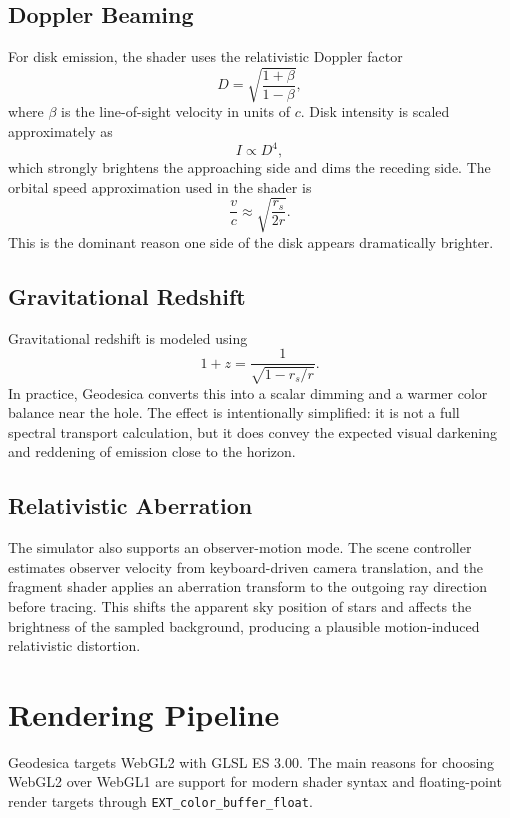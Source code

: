 \documentclass[12pt]{article}
\begin{document}
\subsection{Doppler Beaming}
For disk emission, the shader uses the relativistic Doppler factor
\begin{equation}
D = \sqrt{\frac{1+\beta}{1-\beta}},
\label{eq:doppler_factor}
\end{equation}
where $\beta$ is the line-of-sight velocity in units of $c$. Disk intensity is scaled approximately as
\begin{equation}
I \propto D^4,
\label{eq:doppler_intensity}
\end{equation}
which strongly brightens the approaching side and dims the receding side. The orbital speed approximation used in the shader is
\begin{equation}
\frac{v}{c} \approx \sqrt{\frac{r_s}{2r}}.
\label{eq:keplerian_beta}
\end{equation}
This is the dominant reason one side of the disk appears dramatically brighter.

\subsection{Gravitational Redshift}
Gravitational redshift is modeled using
\begin{equation}
1 + z = \frac{1}{\sqrt{1 - r_s/r}}.
\label{eq:grav_redshift}
\end{equation}
In practice, Geodesica converts this into a scalar dimming and a warmer color balance near the hole. The effect is intentionally simplified: it is not a full spectral transport calculation, but it does convey the expected visual darkening and reddening of emission close to the horizon.

\subsection{Relativistic Aberration}
The simulator also supports an observer-motion mode. The scene controller estimates observer velocity from keyboard-driven camera translation, and the fragment shader applies an aberration transform to the outgoing ray direction before tracing. This shifts the apparent sky position of stars and affects the brightness of the sampled background, producing a plausible motion-induced relativistic distortion.

\section{Rendering Pipeline}
Geodesica targets WebGL2 with GLSL ES 3.00. The main reasons for choosing WebGL2 over WebGL1 are support for modern shader syntax and floating-point render targets through \texttt{EXT\_color\_buffer\_float}.
\end{document}
